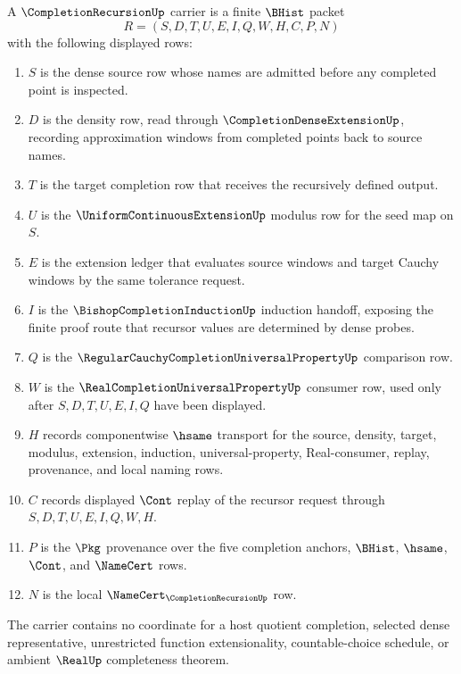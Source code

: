 \begin{definition}
\label{def:completion-recursion-carrier}
A $\CompletionRecursionUp$ carrier is a finite $\BHist$ packet
$$
R=(S,D,T,U,E,I,Q,W,H,C,P,N)
$$
with the following displayed rows:
\begin{enumerate}
\item $S$ is the dense source row whose names are admitted before any completed point is inspected.
\item $D$ is the density row, read through $\CompletionDenseExtensionUp$, recording approximation windows from completed points back to source names.
\item $T$ is the target completion row that receives the recursively defined output.
\item $U$ is the $\UniformContinuousExtensionUp$ modulus row for the seed map on $S$.
\item $E$ is the extension ledger that evaluates source windows and target Cauchy windows by the same tolerance request.
\item $I$ is the $\BishopCompletionInductionUp$ induction handoff, exposing the finite proof route that recursor values are determined by dense probes.
\item $Q$ is the $\RegularCauchyCompletionUniversalPropertyUp$ comparison row.
\item $W$ is the $\RealCompletionUniversalPropertyUp$ consumer row, used only after $S,D,T,U,E,I,Q$ have been displayed.
\item $H$ records componentwise $\hsame$ transport for the source, density, target, modulus, extension, induction, universal-property, Real-consumer, replay, provenance, and local naming rows.
\item $C$ records displayed $\Cont$ replay of the recursor request through $S,D,T,U,E,I,Q,W,H$.
\item $P$ is the $\Pkg$ provenance over the five completion anchors, $\BHist$, $\hsame$, $\Cont$, and $\NameCert$ rows.
\item $N$ is the local $\NameCert_{\CompletionRecursionUp}$ row.
\end{enumerate}
The carrier contains no coordinate for a host quotient completion, selected dense representative, unrestricted function extensionality, countable-choice schedule, or ambient $\RealUp$ completeness theorem.
\end{definition}

